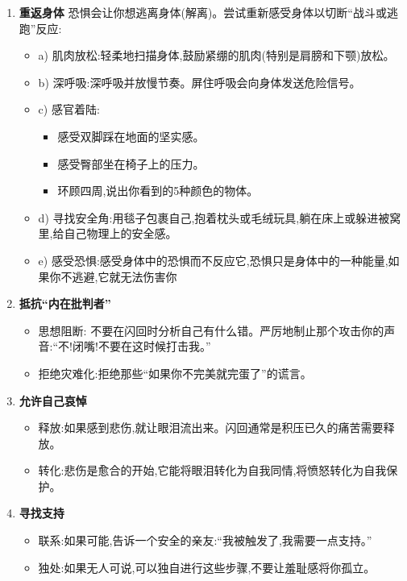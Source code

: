 \documentclass[11pt, a4paper]{article}
\begin{document}
\begin{enumerate}
    \item \textbf{重返身体}
    恐惧会让你想逃离身体(解离)。尝试重新感受身体以切断“战斗或逃跑”反应:
    \begin{itemize}
        \item a) 肌肉放松:轻柔地扫描身体,鼓励紧绷的肌肉(特别是肩膀和下颚)放松。
        \item b) 深呼吸:深呼吸并放慢节奏。屏住呼吸会向身体发送危险信号。
        \item c) 感官着陆:
        \begin{itemize}
            \item 感受双脚踩在地面的坚实感。
            \item 感受臀部坐在椅子上的压力。
            \item 环顾四周,说出你看到的5种颜色的物体。
        \end{itemize}
        \item d) 寻找安全角:用毯子包裹自己,抱着枕头或毛绒玩具,躺在床上或躲进被窝里,给自己物理上的安全感。
        \item e) 感受恐惧:感受身体中的恐惧而不反应它,恐惧只是身体中的一种能量,如果你不逃避,它就无法伤害你
    \end{itemize}

    \item \textbf{抵抗“内在批判者”}
    \begin{itemize}
        \item 思想阻断: 不要在闪回时分析自己有什么错。严厉地制止那个攻击你的声音:“不!闭嘴!不要在这时候打击我。”
        \item 拒绝灾难化:拒绝那些“如果你不完美就完蛋了”的谎言。
    \end{itemize}

    \item \textbf{允许自己哀悼}
    \begin{itemize}
        \item 释放:如果感到悲伤,就让眼泪流出来。闪回通常是积压已久的痛苦需要释放。
        \item 转化:悲伤是愈合的开始,它能将眼泪转化为自我同情,将愤怒转化为自我保护。
    \end{itemize}

    \item \textbf{寻找支持}
    \begin{itemize}
        \item 联系:如果可能,告诉一个安全的亲友:“我被触发了,我需要一点支持。”
        \item 独处:如果无人可说,可以独自进行这些步骤,不要让羞耻感将你孤立。
    \end{itemize}


\end{enumerate}
\end{document}
